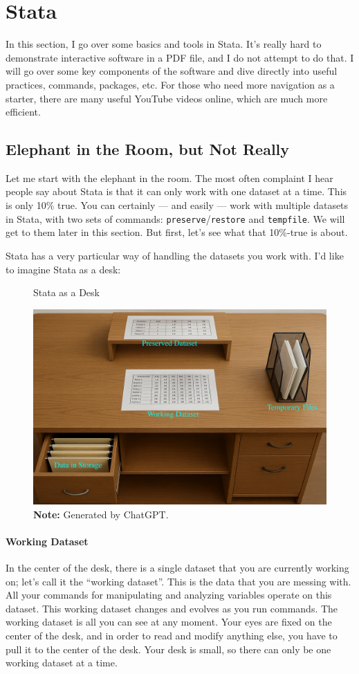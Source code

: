 
\section{Stata} 
In this section, I go over some basics and tools in Stata. It's really hard to demonstrate interactive software in a PDF file, and I do not attempt to do that. I will go over some key components of the software and dive directly into useful practices, commands, packages, etc. For those who need more navigation as a starter, there are many useful YouTube videos online, which are much more efficient.

\subsection{Elephant in the Room, but Not Really}
\label{sec_elepant}
Let me start with the elephant in the room. The most often complaint I hear people say about Stata is that it can only work with one dataset at a time. This is only 10\% true. You can certainly --- and easily --- work with multiple datasets in Stata, with two sets of commands: \verb|preserve|/\verb|restore| and \verb|tempfile|. We will get to them later in this section. But first, let's see what that 10\%-true is about. 

Stata has a very particular way of handling the datasets you work with. I'd like to imagine Stata as a desk:
\begin{figure}[H]
    \centering
    \caption{Stata as a Desk}
    \label{fig_desk}
    \includegraphics[width=0.9\linewidth]{Output/Figures/desk.png}
    \caption*{\scriptsize\textbf{Note:} Generated by ChatGPT.}
\end{figure}

\paragraph{Working Dataset} In the center of the desk, there is a single dataset that you are currently working on; let's call it the ``working dataset''. This is the data that you are messing with. All your commands for manipulating and analyzing variables operate on this dataset. This working dataset changes and evolves as you run commands. The working dataset is all you can see at any moment. Your eyes are fixed on the center of the desk, and in order to read and modify anything else, you have to pull it to the center of the desk. Your desk is small, so there can only be one working dataset at a time. 

